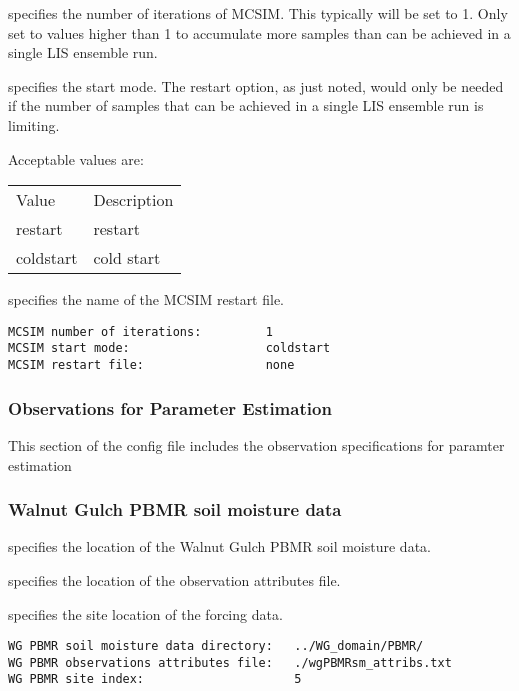  
 
  specifies the 
 number of iterations of MCSIM.  This typically will be
 set to 1.  Only set to values higher than 1 to accumulate more samples
 than can be achieved in a single LIS ensemble run.

  specifies the start mode.  The restart option, as just noted,
 would only be needed if the number of samples that can be achieved in a single LIS ensemble run is limiting.
 
 Acceptable values are:
 \begin{tabular}{ll}
 Value     & Description \\
 restart   & restart     \\
 coldstart & cold start  \\
 \end{tabular}

  specifies the name of the 
 MCSIM restart file.
 

 \begin{Verbatim}[frame=single]
MCSIM number of iterations:         1
MCSIM start mode:                   coldstart 
MCSIM restart file:                 none
 \end{Verbatim}

 
 \subsubsection{Observations for Parameter Estimation} \label{ssec:peobs}
 This section of the config file includes the observation specifications
 for paramter estimation
 

 
 
 \subsubsection{Walnut Gulch PBMR soil moisture data}
 \label{sssec:wgpbmrsm}
  specifies the location
 of the Walnut Gulch PBMR soil moisture data.

  specifies the location
 of the observation attributes file.

  specifies the site location of the
 forcing data.
 
 

 
 \begin{Verbatim}[frame=single]
WG PBMR soil moisture data directory:   ../WG_domain/PBMR/
WG PBMR observations attributes file:   ./wgPBMRsm_attribs.txt
WG PBMR site index:                     5 
 \end{Verbatim}
 

